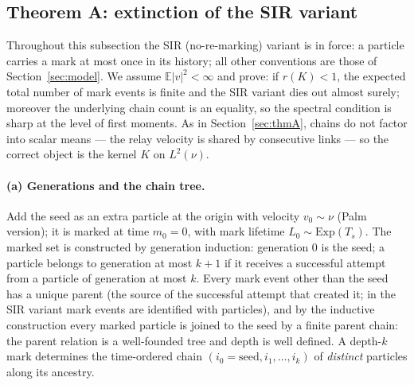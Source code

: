 \documentclass[11pt]{article}
\newcommand{\E}{\mathbb{E}}
\newcommand{\Ts}{T_s}
\begin{document}
\subsection{Theorem A: extinction of the SIR variant}\label{app:thmA}

Throughout this subsection the SIR (no-re-marking) variant is in force: a
particle carries a mark at most once in its history; all other conventions
are those of Section~\ref{sec:model}. We assume $\E|v|^2<\infty$ and prove:
if $r(K)<1$, the expected total number of mark events is finite and the SIR
variant dies out almost surely; moreover the underlying chain count is an
equality, so the spectral condition is sharp at the level of first moments.
As in Section~\ref{sec:thmA}, chains do not factor into scalar means ---
the relay velocity is shared by consecutive links --- so the correct object
is the kernel $K$ on $L^2(\nu)$.

\paragraph{(a) Generations and the chain tree.}
Add the seed as an extra particle at the origin with velocity $v_0\sim\nu$
(Palm version); it is marked at time $m_0=0$, with mark lifetime
$L_0\sim\mathrm{Exp}(\Ts)$. The marked set is constructed by generation
induction: generation $0$ is the seed; a particle belongs to generation at
most $k{+}1$ if it receives a successful attempt from a particle of
generation at most $k$. Every mark event other than the seed has a unique
parent (the source of the successful attempt that created it; in the SIR
variant mark events are identified with particles), and by the inductive
construction every marked particle is joined to the seed by a finite parent
chain: the parent relation is a well-founded tree and depth is well
defined. A depth-$k$ mark determines the time-ordered chain
$(i_0=\text{seed},i_1,\dots,i_k)$ of \emph{distinct} particles along its
ancestry.
\end{document}
